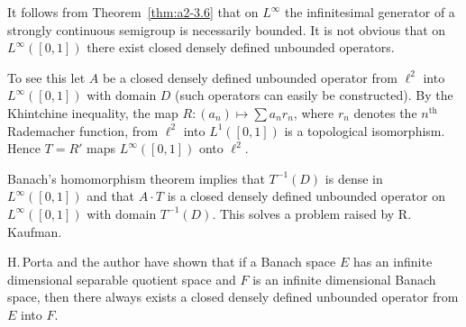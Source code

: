 \begin{remark*}\label{rem:a2-final}
It follows from Theorem~\ref{thm:a2-3.6} that on $L^{\infty}$ the infinitesimal generator of a strongly continuous semigroup is necessarily bounded.
It is not obvious that on $L^{\infty}([0,1])$ there exist closed densely defined unbounded operators.

To see this let $A$ be a closed densely defined unbounded operator from $\ell^2$ into $L^{\infty}([0,1])$ with domain $D$ (such operators can easily be constructed).
By the Khintchine inequality, the map $R \colon (a_{n}) \mapsto \sum a_{n}r_{n}$, where $r_{n}$ denotes the $n^{\text{th}}$ Rademacher function, from $\ell^2$ into $L^1([0,1])$ is a topological isomorphism.
Hence $T = R'$ maps $L^{\infty}([0,1])$ onto $\ell^2$.

Banach's homomorphism theorem implies that $T^{-1}(D)$ is dense in $L^{\infty}([0,1])$ and that $A \cdot T$ is a closed densely defined unbounded operator on $L^{\infty}([0,1])$ with domain $T^{-1}(D)$.
This solves a problem raised by R.\,Kaufman.

H.\,Porta and the author have shown that if a Banach space $E$ has an infinite dimensional separable quotient space and $F$ is an infinite dimensional Banach space, then there always exists a closed densely defined unbounded operator from $E$ into $F$.
\end{remark*}
